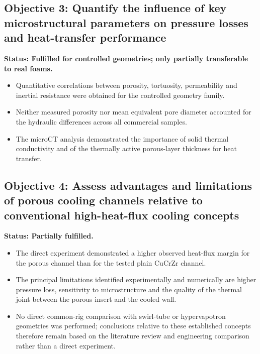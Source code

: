 \documentclass[a4paper]{article}
\begin{document}
\subsection{Objective 3: Quantify the influence of key microstructural parameters on pressure losses and heat-transfer performance}
\textbf{Status: Fulfilled for controlled geometries; only partially transferable to real foams.}
\begin{itemize}
    \item Quantitative correlations between porosity, tortuosity, permeability and inertial resistance were obtained for the controlled geometry family.
    \item Neither measured porosity nor mean equivalent pore diameter accounted for the hydraulic differences across all commercial samples.
    \item The microCT analysis demonstrated the importance of solid thermal conductivity and of the thermally active porous-layer thickness for heat transfer.
\end{itemize}

\subsection{Objective 4: Assess advantages and limitations of porous cooling channels relative to conventional high-heat-flux cooling concepts}
\textbf{Status: Partially fulfilled.}
\begin{itemize}
    \item The direct experiment demonstrated a higher observed heat-flux margin for the porous channel than for the tested plain CuCrZr channel.
    \item The principal limitations identified experimentally and numerically are higher pressure loss, sensitivity to microstructure and the quality of the thermal joint between the porous insert and the cooled wall.
    \item No direct common-rig comparison with swirl-tube or hypervapotron geometries was performed; conclusions relative to these established concepts therefore remain based on the literature review and engineering comparison rather than a direct experiment.
\end{itemize}
\end{document}
